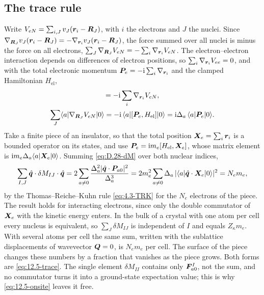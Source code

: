 \subsection{The trace rule}\label{app:D.34-trace}

Write $V_{eN} = \sum_{i,J}v_J(\bm{r}_i - \bm{R}_J)$, with $i$ the electrons and $J$ the nuclei. Since $\nabla_{\bm{R}_J}v_J(\bm{r}_i - \bm{R}_J) = -\nabla_{\bm{r}_i}v_J(\bm{r}_i - \bm{R}_J)$, the force summed over all nuclei is minus the force on all electrons, $\sum_J\nabla_{\bm{R}_J}V_{eN} = -\sum_i\nabla_{\bm{r}_i}V_{eN}$. The electron--electron interaction depends on differences of electron positions, so $\sum_i\nabla_{\bm{r}_i}V_{ee} = 0$, and with the total electronic momentum $\bm{P}_e = -\mathrm{i}\sum_i\nabla_{\bm{r}_i}$ and the clamped Hamiltonian $H_{\mathrm{el}}$,
\begin{gather*}
  [\vect{P}_e, H_{\mathrm{el}}] = -\ii\sum_i\nabla_{\vect{r}_i}V_{eN} , \\
  \sum_J\langle a|\nabla_{\vect{R}_J}V_{eN}|0\rangle = -\ii\,\langle a|[\vect{P}_e, H_{\mathrm{el}}]|0\rangle = \ii\Delta_a\,\langle a|\vect{P}_e|0\rangle .
\end{gather*}
Take a finite piece of an insulator, so that the total position $\bm{X}_e = \sum_i\bm{r}_i$ is a bounded operator on its states, and use $\bm{P}_e = \mathrm{i} m_e[H_{\mathrm{el}}, \bm{X}_e]$, whose matrix element is $\mathrm{i} m_e\Delta_a\langle a|\bm{X}_e|0\rangle$. Summing \cref{eq:D.28-dM} over both nuclear indices,
\begin{equation*}
  \sum_{I,J}\hat{\bm{q}}\cdot\delta M_{IJ}\cdot\hat{\bm{q}} = 2\sum_{a\neq0}\frac{\Delta_a^2|\hat{\bm{q}}\cdot\bm{P}_{a0}|^2}{\Delta_a^3}
  = 2m_e^2\sum_{a\neq0}\Delta_a\,|\langle a|\hat{\bm{q}}\cdot\bm{X}_e|0\rangle|^2 = N_em_e ,
\end{equation*}
by the Thomas--Reiche--Kuhn rule \cref{eq:4.3-TRK} for the $N_e$ electrons of the piece. The result holds for interacting electrons, since only the double commutator of $\bm{X}_e$ with the kinetic energy enters. In the bulk of a crystal with one atom per cell every nucleus is equivalent, so $\sum_J\delta M_{IJ}$ is independent of $I$ and equals $Z_\kappa m_e$. With several atoms per cell the same sum, written with the sublattice displacements of wavevector $\bm{Q} = 0$, is $N_em_e$ per cell. The surface of the piece changes these numbers by a fraction that vanishes as the piece grows. Both forms are \cref{eq:12.5-trace}. The single element $\delta M_{II}$ contains only $\bm{F}^I_{a0}$, not the sum, and no commutator turns it into a ground-state expectation value; this is why \cref{eq:12.5-onsite} leaves it free.

